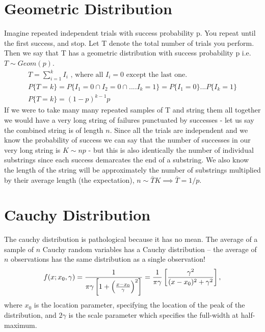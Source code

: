 \section{Geometric Distribution}
Imagine repeated independent trials with success probability p. You repeat until the first success, and stop. Let T denote the total number of trials you perform. Then we say that T has a geometric distribution with success probability p i.e. $T\sim Geom(p)$. 
\begin{align}
T = \sum_{i=1}^k I_i \text{ , where all $I_i=0$ except the last one.}\\
P\{T=k\} = P\{I_1 = 0 \cap I_2 = 0 \cap....I_k = 1\} = P\{I_1 = 0\}...P\{I_k=1\}\\
P\{T=k\} = (1-p)^{k-1}p
\end{align}
If we were to take many many repeated samples of T and string them all together we would have a very long string of failures punctuated by successes - let us say the combined string is of length $n$. Since all the trials are independent and we know the probability of success we can say that the number of successes in our very long string is $K\sim np$ - but this is also identically the number of individual substrings since each success demarcates the end of a substring. We also know the length of the string will be approximately the number of substrings multiplied by their average length (the expectation), $n\sim \bar{T}K \implies \bar{T} = 1/p.$



\section{Cauchy Distribution}
The cauchy distribution is pathological because it has no mean. The average of a sample of $n$ Cauchy random variables has a Cauchy distribution – the average of $n$ observations has the same distribution as a single observation!
\begin{equation}
f(x; x_0,\gamma) = \frac{1}{\pi\gamma \left[1 + \left(\frac{x - x_0}{\gamma}\right)^2\right]} = { 1 \over \pi \gamma } \left[ { \gamma^2 \over (x - x_0)^2 + \gamma^2  } \right], 
\end{equation}
where $x_0$ is the location parameter, specifying the location of the peak of the distribution, and $2\gamma$ is the scale parameter which specifies the full-width at half-maximum.



